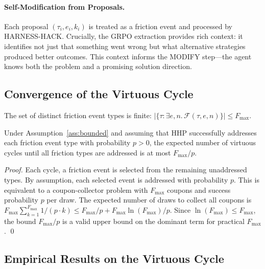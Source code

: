 \paragraph{Self-Modification from Proposals.}
Each proposal $(\tau_i, e_i, k_i)$ is treated as a friction event and processed
by HARNESS-HACK. Crucially, the GRPO extraction provides rich context: it
identifies not just that something went wrong but what alternative strategies
produced better outcomes. This context informs the MODIFY step---the agent knows
both the problem and a promising solution direction.

\subsection{Convergence of the Virtuous Cycle}
\label{sec:convergence}

\begin{assumption}
\label{ass:bounded}
The set of distinct friction event types is finite: $|\{\tau : \exists e, n.\,
\mathcal{F}(\tau, e, n)\}| \leq F_{\max}$.
\end{assumption}

\begin{theorem}
\label{thm:convergence}
Under Assumption~\ref{ass:bounded} and assuming that HHP successfully addresses
each friction event type with probability $p > 0$, the expected number of
virtuous cycles until all friction types are addressed is at most
$F_{\max} / p$.
\end{theorem}

\begin{proof}
Each cycle, a friction event is selected from the remaining unaddressed types.
By assumption, each selected event is addressed with probability $p$. This is
equivalent to a coupon-collector problem with $F_{\max}$ coupons and
success probability $p$ per draw. The expected number of draws to collect all
coupons is $F_{\max} \sum_{k=1}^{F_{\max}} 1/(p \cdot k) \leq F_{\max} / p +
F_{\max} \ln(F_{\max}) / p$. Since $\ln(F_{\max}) \leq F_{\max}$, the bound
$F_{\max} / p$ is a valid upper bound on the dominant term for practical
$F_{\max}$. \qed
\end{proof}

\subsection{Empirical Results on the Virtuous Cycle}
\label{sec:virtuous-empirical}

